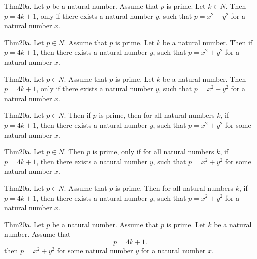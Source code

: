 \documentclass{article}
\begin{document}
Thm20a. Let $p$ be a natural number. Assume that $p$ is prime. Let $k \in N$. Then $p = 4 k + 1$, only if there exists a natural number $y$, such that $p = x ^{ 2}+ y ^{ 2}$ for a natural number $x$.

Thm20a. Let $p \in N$. Assume that $p$ is prime. Let $k$ be a natural number. Then if $p = 4 k + 1$, then there exists a natural number $y$, such that $p = x ^{ 2}+ y ^{ 2}$ for a natural number $x$.

Thm20a. Let $p \in N$. Assume that $p$ is prime. Let $k$ be a natural number. Then $p = 4 k + 1$, only if there exists a natural number $y$, such that $p = x ^{ 2}+ y ^{ 2}$ for a natural number $x$.

Thm20a. Let $p \in N$. Then if $p$ is prime, then for all natural numbers $k$, if $p = 4 k + 1$, then there exists a natural number $y$, such that $p = x ^{ 2}+ y ^{ 2}$ for some natural number $x$.

Thm20a. Let $p \in N$. Then $p$ is prime, only if for all natural numbers $k$, if $p = 4 k + 1$, then there exists a natural number $y$, such that $p = x ^{ 2}+ y ^{ 2}$ for some natural number $x$.

Thm20a. Let $p \in N$. Assume that $p$ is prime. Then for all natural numbers $k$, if $p = 4 k + 1$, then there exists a natural number $y$, such that $p = x ^{ 2}+ y ^{ 2}$ for a natural number $x$.

Thm20a. Let $p$ be a natural number. Assume that $p$ is prime. Let $k$ be a natural number. Assume that $$p = 4 k + 1.$$ then $p = x ^{ 2}+ y ^{ 2}$ for some natural number $y$ for a natural number $x$.
\end{document}
